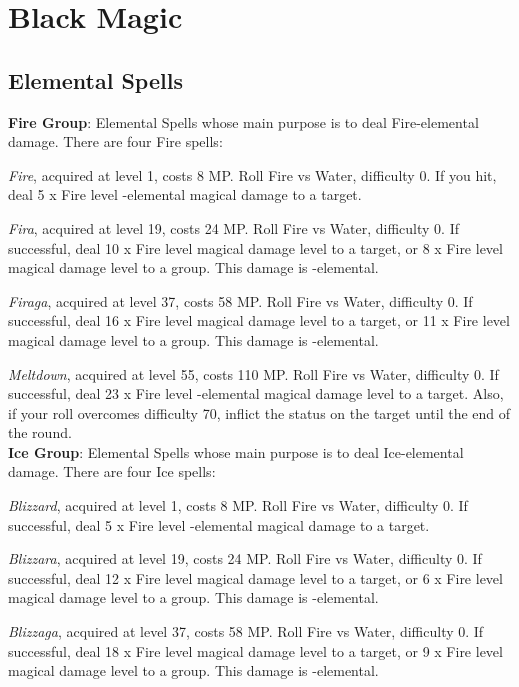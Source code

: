\section{Black Magic}\label{sec:magic-black}
\begin{multicols}{2}
    \subsection{Elemental Spells}\label{subsec:black-elemental}
    
    \textbf{Fire Group}: Elemental Spells whose main purpose is to deal Fire-elemental damage. There are four Fire spells:

	\textit{Fire}, acquired at level 1, costs 8 MP\@. Roll Fire vs Water, difficulty 0. If you hit, deal 5 x Fire level -elemental magical damage to a target.
    
    \textit{Fira}, acquired at level 19, costs 24 MP\@. Roll Fire vs Water, difficulty 0. If successful, deal 10 x Fire level magical damage level to a target, or 8 x Fire level magical damage level to a group. This damage is -elemental.
    
    \textit{Firaga}, acquired at level 37, costs 58 MP\@. Roll Fire vs Water, difficulty 0. If successful, deal 16 x Fire level magical damage level to a target, or 11 x Fire level magical damage level to a group. This damage is -elemental.
    
    \textit{Meltdown}, acquired at level 55, costs 110 MP\@. Roll Fire vs Water, difficulty 0. If successful, deal 23 x Fire level -elemental magical damage level to a target. Also, if your roll overcomes difficulty 70, inflict the  status on the target until the end of the round.\\%
    
    \textbf{Ice Group}: Elemental Spells whose main purpose is to deal Ice-elemental damage. There are four Ice spells:
    
    \textit{Blizzard}, acquired at level 1, costs 8 MP\@. Roll Fire vs Water, difficulty 0. If successful, deal 5 x Fire level -elemental magical damage to a target.
    
    \textit{Blizzara}, acquired at level 19, costs 24 MP\@. Roll Fire vs Water, difficulty 0. If successful, deal 12 x Fire level magical damage level to a target, or 6 x Fire level magical damage level to a group. This damage is -elemental.
    
    \textit{Blizzaga}, acquired at level 37, costs 58 MP\@. Roll Fire vs Water, difficulty 0. If successful, deal 18 x Fire level magical damage level to a target, or 9 x Fire level magical damage level to a group. This damage is -elemental.
    

\end{multicols}
